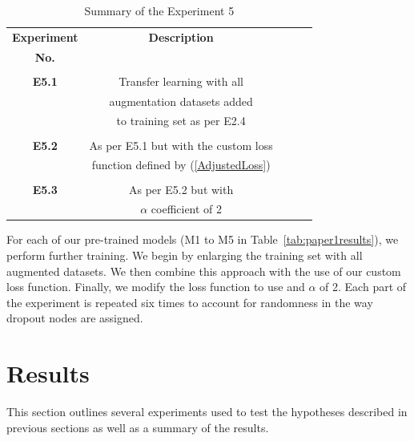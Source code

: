 \begin{table}[h!]
	 \begin{center}
		
		\begin{tabular}{c|c|c|r|c} %
			\textbf{Experiment} & \textbf{Description}  \\
			\textbf{No.} & \\
			\hline
			& \\
			
			\textbf{E5.1} & Transfer learning with all  \\  
			
			& augmentation datasets added\\
			
			&  to training set as per E2.4\\
			
			& \\
			
			\textbf{E5.2} & As per E5.1 but with the custom loss  \\  
			
			&  function defined by (\ref{AdjustedLoss})  \\
			
			& \\
			\textbf{E5.3} & As per E5.2 but with  \\  
			&  $\alpha$ coefficient of 2 \\
			
			
		\end{tabular}
		\caption{Summary of the Experiment 5} {For each of our pre-trained models (M1 to M5 in Table~\ref{tab:paper1results}), we perform further training. We begin by enlarging the training set with all augmented datasets. We then combine this approach with the use of our custom loss function. Finally, we modify the loss function to use and $\alpha$ of 2. Each part of the experiment is repeated six times to account for randomness in the way dropout nodes are assigned.}
		\label{tab:Experiment5}
		 \end{center}
\end{table}


\section{Results} 

This section outlines several experiments used to test the hypotheses described in previous sections as well as a summary of the results.



